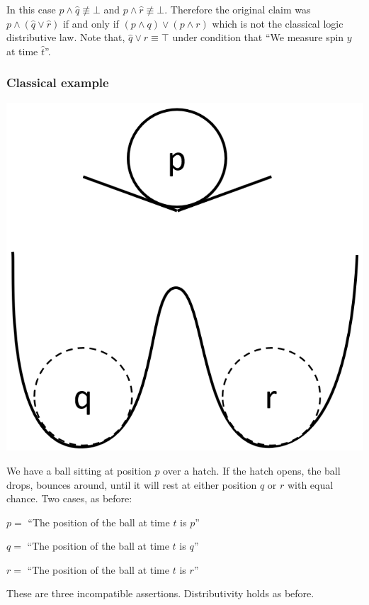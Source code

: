 \documentclass[10pt,twocolumn, nofootinbib]{revtex4-1}
\begin{document}
In this case $p \wedge \hat{q} \nequiv \bot$ and $p \wedge \hat{r} \nequiv \bot$. Therefore the original claim was $p \wedge (\hat{q} \vee \hat{r})$ if and only if $(p \wedge  q) \vee (p \wedge r)$ which is not the classical logic distributive law. Note that, $\hat{q} \vee \hat{r} \equiv \top$ under condition that ``We measure spin $y$ at time $\hat{t}$''.

\subsubsection{Classical example}
\includegraphics[width=\columnwidth]{Balldrop.png}

We have a ball sitting at position $p$ over a hatch. If the hatch opens, the ball drops, bounces around, until it will rest at either position $q$ or $r$ with equal chance. Two cases, as before:

\begin{description}
    \item $p =$ ``The position of the ball at time $t$ is $p$''
    \item $q =$ ``The position of the ball at time $t$ is $q$''
    \item $r =$ ``The position of the ball at time $t$ is $r$''
\end{description}

These are three incompatible assertions. Distributivity holds as before.
\end{document}
